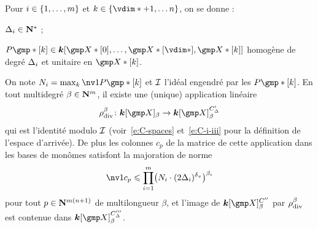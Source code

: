 \begin{lem}
  Pour \( i \in \{ 1, \dots, m \} \) et \( \ind \in \{ \vdim* + 1,
  \dots \dimp \} \), on se donne :
  \begin{enumthm}
    \item \( \Delta_i \in {\mathbf{N}}^* \) ;
    \item \( P\mexp*[\ind]
      \in
      \cdn [ \vmp*[0], \dots, \vmp*[\vdim*], \vmp*[\ind] ] \)
      homogène de degré \( \Delta_i \) et unitaire en \( \vmp*[\ind]
      \).
  \end{enumthm}
  On note \( N_\fct = \max_\ind \nv1 { P\mexp*[\ind] } \) et \( \mathcal I \)
  l'idéal engendré par les \( P\mexp*[\ind] \). En tout multidegré
  \( \beta \in {\mathbf{N}}^m \), il existe une (unique) application linéaire
  \begin{equation}
    \rdiv^\beta \colon \cdn [\vmp]_ \beta \to \cdn [\vmp]_ \beta^{C'_\Delta}
  \end{equation}
  qui est l'identité modulo \( \mathcal I \) (voir~\eqref{e:C-spaces}
  et~\eqref{e:C-i-iii} pour la définition de l'espace d'arrivée). De plus les
  colonnes \( c_p \) de la matrice de cette application dans les bases de
  monômes satisfont la majoration de norme
  \begin{equation}
    \nv1{c_p}
    \le
    \prod\fctrange \bigl(
    N_\fct \cdot (2 \Delta_\fct)^\dv
    \bigr) ^{\beta_\fct}
  \end{equation}
  pour tout \( p \in {\mathbf{N}}^{m(n+1)} \) de multilongueur \( \beta \), et
  l'image de \( \cdn [\vmp]_ \beta ^{C''} \) par \( \rho\sb{\mathrm{div }}^\beta \) est
  contenue dans \( \cdn [\vmp]_ \beta ^{C'''_\Delta} \).
\end{lem}

